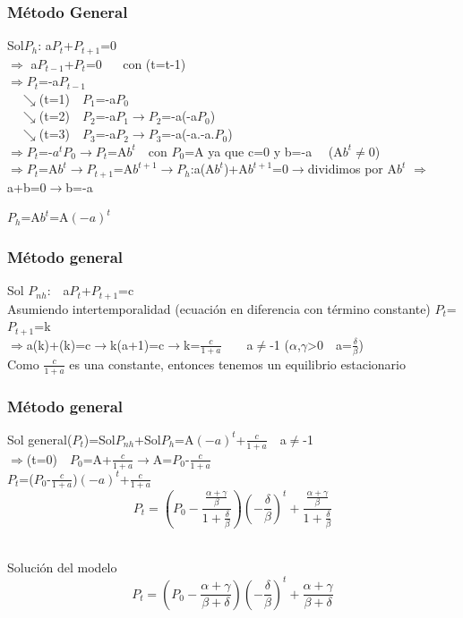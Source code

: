 \documentclass[11pt]{beamer}
\begin{document}
\begin{frame}
\frametitle{Método General}
Sol$P_h$: a$P_t$+$P_{t+1}$=0
\\
$\Longrightarrow$ a$P_{t-1}$+$P_t$=0 $\quad$ con (t=t-1)
\\
$\Longrightarrow$$P_t$=-a$P_{t-1}$
\pause
\\
$\quad$$\searrow$(t=1)$\quad$$P_1$=-a$P_0$
\\
$\quad$$\searrow$(t=2)$\quad$$P_2$=-a$P_1$$\rightarrow$$P_2$=-a(-a$P_0$)
\\
$\quad$$\searrow$(t=3)$\quad$$P_3$=-a$P_2$$\rightarrow$$P_3$=-a(-a.-a.$P_0$)
\pause
\\
$\Longrightarrow$$P_t$=-$a^t$$P_0$$\rightarrow$$P_t$=A$b^t$$\quad$con $P_0$=A ya que c=0 y b=-a $\quad$(A$b^t$$\neq$0)
\\
$\Longrightarrow$$P_t$=A$b^t$$\rightarrow$$P_{t+1}$=A$b^{t+1}$$\rightarrow$$P_h$:a(A$b^t$)+A$b^{t+1}$=0$\rightarrow$dividimos por A$b^t$
$\Longrightarrow$a+b=0$\rightarrow$b=-a
\begin{block}{}
\begin{center}
	$P_h$=A$b^t$=A$(-a)^t$
\end{center}
\end{block}
\end{frame}
\begin{frame}
	\frametitle{Método general}
	Sol $P_{nh}$:$\quad$a$P_t$+$P_{t+1}$=c $\quad$ 
	\\
	Asumiendo intertemporalidad (ecuación  en  diferencia  con  término  constante) $P_t$=$P_{t+1}$=k
	\\
	$\Longrightarrow$a(k)+(k)=c$\rightarrow$k(a+1)=c$\rightarrow$k=$\frac{c}{1+a}$$\quad$$\quad$a$\neq$-1 ($\alpha$,$\gamma$>0$\quad$a=$\frac{\delta}{\beta}$)
	\\
	Como $\frac{c}{1+a}$ es una constante, entonces tenemos un equilibrio estacionario
\end{frame}
\begin{frame}
	\frametitle{Método general}
	Sol general($P_t$)=Sol$P_{nh}$+Sol$P_h$=A$(-a)^t$+$\frac{c}{1+a}$$\quad$a$\neq$-1
	\\
	$\Longrightarrow$(t=0)$\quad$$P_0$=A+$\frac{c}{1+a}$$\rightarrow$A=$P_0$-$\frac{c}{1+a}$
	\\
	$P_t$=($P_0$-$\frac{c}{1+a}$)$(-a)^t$+$\frac{c}{1+a}$
	\\
	\begin{equation*}
	P_{t}=(P_{0}-\frac{\frac{\alpha+\gamma}{\beta}}{1+\frac{\delta}{\beta}})(-\frac{\delta}{\beta})^{t}+\frac{\frac{\alpha+\gamma}{\beta}}{1+\frac{\delta}{\beta}}
	\end{equation*}
	\\
\begin{block}{Solución del modelo}
\begin{equation*}
P_{t}=(P_{0}-\frac{\alpha+\gamma}{\beta+\delta})(-\frac{\delta}{\beta})^t+\frac{\alpha+\gamma}{\beta+\delta}
\end{equation*}
\end{block}
\end{frame}
\end{document}
